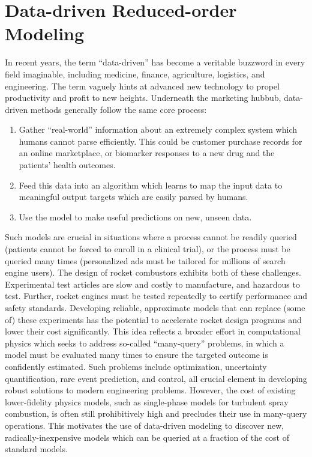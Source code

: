 \section{Data-driven Reduced-order Modeling}

In recent years, the term ``data-driven'' has become a veritable buzzword in every field imaginable, including medicine, finance, agriculture, logistics, and engineering. The term vaguely hints at advanced new technology to propel productivity and profit to new heights. Underneath the marketing hubbub, data-driven methods generally follow the same core process:

\begin{enumerate}
    \item Gather ``real-world'' information about an extremely complex system which humans cannot parse efficiently. This could be customer purchase records for an online marketplace, or biomarker responses to a new drug and the patients' health outcomes.
    \item Feed this data into an algorithm which learns to map the input data to meaningful output targets which are easily parsed by humans.
    \item Use the model to make useful predictions on new, unseen data.
\end{enumerate}

Such models are crucial in situations where a process cannot be readily queried (patients cannot be forced to enroll in a clinical trial), or the process must be queried many times (personalized ads must be tailored for millions of search engine users). The design of rocket combustors exhibits both of these challenges. Experimental test articles are slow and costly to manufacture, and hazardous to test. Further, rocket engines must be tested repeatedly to certify performance and safety standards. Developing reliable, approximate models that can replace (some of) these experiments has the potential to accelerate rocket design programs and lower their cost significantly. This idea reflects a broader effort in computational physics which seeks to address so-called ``many-query'' problems, in which a model must be evaluated many times to ensure the targeted outcome is confidently estimated. Such problems include optimization, uncertainty quantification, rare event prediction, and control, all crucial element in developing robust solutions to modern engineering problems. However, the cost of existing lower-fidelity physics models, such as single-phase models for turbulent spray combustion, is often still prohibitively high and precludes their use in many-query operations. This motivates the use of data-driven modeling to discover new, radically-inexpensive models which can be queried at a fraction of the cost of standard models.


